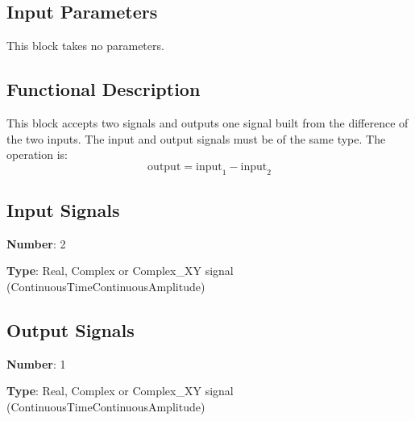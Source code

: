 \documentclass[../../sdf/tex/BPSK_system.tex]{subfiles}
\date{}
\begin{document}
\onlyinsubfile{\maketitle}

\subsection*{Input Parameters}

This block takes no parameters.

\subsection*{Functional Description}

This block accepts two signals and outputs one signal built from the difference of the two inputs. The input and output signals must be of the same type. The operation is:
$$
\textrm{output} = \textrm{input}_1 - \textrm{input}_2
$$

\subsection*{Input Signals}

\textbf{Number}: 2

\textbf{Type}: Real, Complex or Complex\_XY signal (ContinuousTimeContinuousAmplitude)

\subsection*{Output Signals}

\textbf{Number}: 1

\textbf{Type}: Real, Complex or Complex\_XY signal (ContinuousTimeContinuousAmplitude)
\end{document}
